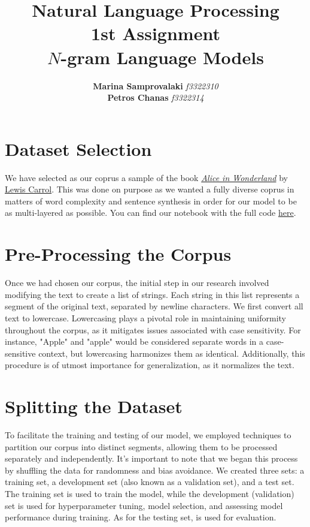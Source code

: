 \documentclass[11pt,onside]{article}
\title{\blue \textbf{Natural Language Processing} \\
\blue 1st Assignment \\ \(N\)-gram Language Models}
\author{\textbf{Marina Samprovalaki} \textit{f3322310} \\ \textbf{Petros Chanas} \textit{f3322314} }
\begin{document}
\maketitle

\section*{Dataset Selection}
We have selected as our coprus a sample of the book \href{https://en.wikipedia.org/wiki/Alice%27s_Adventures_in_Wonderland}{\textit{Alice in Wonderland}} by \href{https://en.wikipedia.org/wiki/Lewis_Carroll}{Lewis Carrol}. This was done on purpose as we wanted a fully diverse coprus in matters of word complexity and sentence synthesis in order for our model to be as multi-layered as possible. You can find our notebook with the full code \href{https://colab.research.google.com/drive/1vNeEjUFaHNf8esvHM9vQNERQQEozdfaX?usp=sharing}{here}.

\section*{Pre-Processing the Corpus}
Once we had chosen our corpus, the initial step in our research involved modifying the text to create a list of strings. Each string in this list represents a segment of the original text, separated by newline characters. We first convert all text to lowercase. Lowercasing plays a pivotal role in maintaining uniformity throughout the corpus, as it mitigates issues associated with case sensitivity. For instance, "Apple" and "apple" would be considered separate words in a case-sensitive context, but lowercasing harmonizes them as identical. Additionally, this procedure is of utmost importance for generalization, as it normalizes the text.

\section*{Splitting the Dataset}
To facilitate the training and testing of our model, we employed techniques to partition our corpus into distinct segments, allowing them to be processed separately and independently. It's important to note that we began this process by shuffling the data for randomness and bias avoidance. We created three sets: a training set, a development set (also known as a validation set), and a test set. The training set is used to train the model, while the development (validation) set is used for hyperparameter tuning, model selection, and assessing model performance during training. As for the testing set, is used for evaluation.
\end{document}
